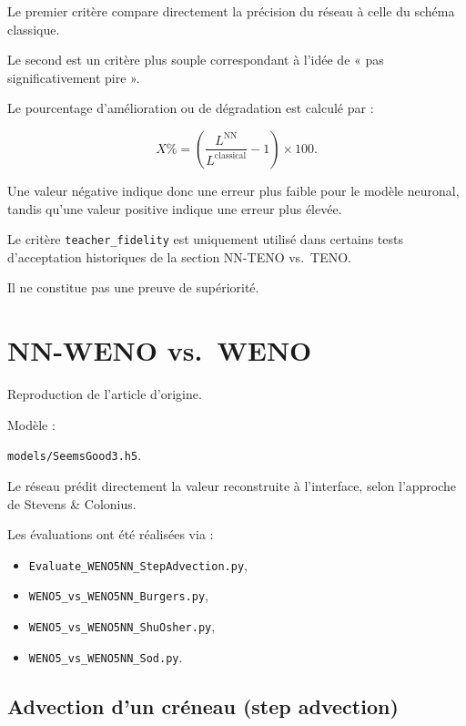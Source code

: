 \documentclass[11pt]{article}
\begin{document}
Le premier critère compare directement la précision du réseau
à celle du schéma classique.

Le second est un critère plus souple correspondant à l'idée de
« pas significativement pire ».

Le pourcentage d'amélioration ou de dégradation est calculé par :

\begin{equation}
X\%
=
\left(
\frac{L^{\text{NN}}}
     {L^{\text{classical}}}
-1
\right)
\times 100.
\end{equation}

Une valeur négative indique donc une erreur plus faible pour le modèle
neuronal, tandis qu'une valeur positive indique une erreur plus élevée.

Le critère \texttt{teacher\_fidelity} est uniquement utilisé dans
certains tests d'acceptation historiques de la section NN-TENO vs.\ TENO.

Il ne constitue pas une preuve de supériorité.



\section{NN-WENO vs.\ WENO}
\label{sec:strand1}

Reproduction de l'article d'origine.

Modèle :

\texttt{models/SeemsGood3.h5}.

Le réseau prédit directement la valeur reconstruite à l'interface,
selon l'approche de Stevens \& Colonius.

Les évaluations ont été réalisées via :

\begin{itemize}
    \item \texttt{Evaluate\_WENO5NN\_StepAdvection.py},
    \item \texttt{WENO5\_vs\_WENO5NN\_Burgers.py},
    \item \texttt{WENO5\_vs\_WENO5NN\_ShuOsher.py},
    \item \texttt{WENO5\_vs\_WENO5NN\_Sod.py}.
\end{itemize}


\subsection{Advection d'un créneau (step advection)}
\end{document}
